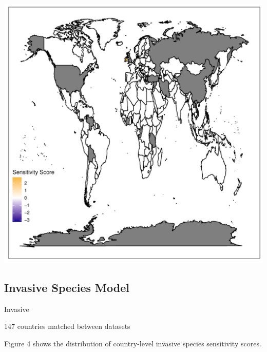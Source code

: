 \documentclass[11pt, a4paper, titlepage]{article}
\begin{document}
	\includegraphics[scale=0.95]{../images/buildlandsensitivitymapgradient.pdf}

	\subsection*{Invasive Species Model}
	Invasive \newline
	
	147 countries matched between datasets 
	
	Figure 4 shows the distribution of country-level invasive species sensitivity scores. \newline
	
\end{document}
